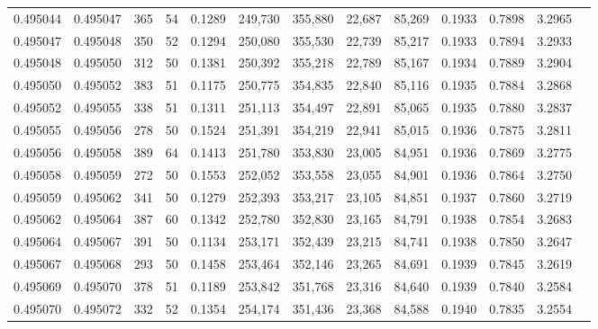 \begin{tabular}{rrrrrrrrrrrrr}
0.495044 & 0.495047 &   365 &  54 &                                     0.1289 & 249,730 & 355,880 &  22,687 &  85,269 & 0.1933 & 0.7898 & 3.2965 \\
0.495047 & 0.495048 &   350 &  52 &                                     0.1294 & 250,080 & 355,530 &  22,739 &  85,217 & 0.1933 & 0.7894 & 3.2933 \\
0.495048 & 0.495050 &   312 &  50 &                                     0.1381 & 250,392 & 355,218 &  22,789 &  85,167 & 0.1934 & 0.7889 & 3.2904 \\
0.495050 & 0.495052 &   383 &  51 &                                     0.1175 & 250,775 & 354,835 &  22,840 &  85,116 & 0.1935 & 0.7884 & 3.2868 \\
0.495052 & 0.495055 &   338 &  51 &                                     0.1311 & 251,113 & 354,497 &  22,891 &  85,065 & 0.1935 & 0.7880 & 3.2837 \\
0.495055 & 0.495056 &   278 &  50 &                                     0.1524 & 251,391 & 354,219 &  22,941 &  85,015 & 0.1936 & 0.7875 & 3.2811 \\
0.495056 & 0.495058 &   389 &  64 &                                     0.1413 & 251,780 & 353,830 &  23,005 &  84,951 & 0.1936 & 0.7869 & 3.2775 \\
0.495058 & 0.495059 &   272 &  50 &                                     0.1553 & 252,052 & 353,558 &  23,055 &  84,901 & 0.1936 & 0.7864 & 3.2750 \\
0.495059 & 0.495062 &   341 &  50 &                                     0.1279 & 252,393 & 353,217 &  23,105 &  84,851 & 0.1937 & 0.7860 & 3.2719 \\
0.495062 & 0.495064 &   387 &  60 &                                     0.1342 & 252,780 & 352,830 &  23,165 &  84,791 & 0.1938 & 0.7854 & 3.2683 \\
0.495064 & 0.495067 &   391 &  50 &                                     0.1134 & 253,171 & 352,439 &  23,215 &  84,741 & 0.1938 & 0.7850 & 3.2647 \\
0.495067 & 0.495068 &   293 &  50 &                                     0.1458 & 253,464 & 352,146 &  23,265 &  84,691 & 0.1939 & 0.7845 & 3.2619 \\
0.495069 & 0.495070 &   378 &  51 &                                     0.1189 & 253,842 & 351,768 &  23,316 &  84,640 & 0.1939 & 0.7840 & 3.2584 \\
0.495070 & 0.495072 &   332 &  52 &                                     0.1354 & 254,174 & 351,436 &  23,368 &  84,588 & 0.1940 & 0.7835 & 3.2554 \\

\end{tabular}
